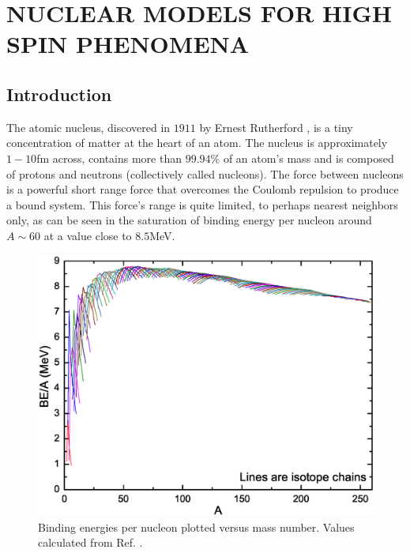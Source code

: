 %
%

\chapter{NUCLEAR MODELS FOR HIGH SPIN PHENOMENA}
\label{chp:models}

\section{Introduction}
\label{sec:models-into}
The atomic nucleus, discovered in $1911$ by Ernest Rutherford \cite{rutherfordNuclearModel}, is a tiny concentration of matter at the heart of an atom. The nucleus is approximately $1-10$fm across, contains more than $99.94\%$ of an atom's mass and is composed of protons and neutrons (collectively called nucleons). The force between nucleons is a powerful short range force that overcomes the Coulomb repulsion to produce a bound system. This force's range is quite limited, to perhaps nearest neighbors only, as can be seen in the saturation of binding energy per nucleon around $A\sim60$ at a value close to $8.5$MeV.

\begin{figure}[h!]
\centerline{\includegraphics[width=\textwidth]{./img/c2/binding_plot.eps}}
	\caption{Binding energies per nucleon plotted versus mass number. Values calculated from Ref. \cite{AME20031,AME20032}.\label{fig:chp2-binding}}
\end{figure}


